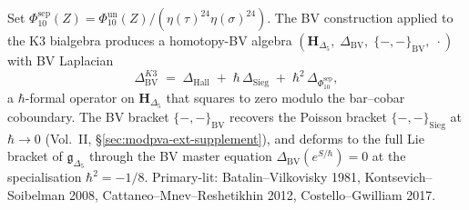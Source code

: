 \begin{remark}
\label{rem:bvconstr-ext-1}
Set \(\Phi_{10}^{\mathrm{sep}}(Z)=
\Phi_{10}^{\mathrm{un}}(Z)/(\eta(\tau)^{24}\eta(\sigma)^{24})\).
The BV construction applied to the K3 bialgebra produces a
homotopy-BV algebra
$(\mathbf H_{\Delta_5},\; \Delta_{\mathrm{BV}},\; \{-,-\}_{\mathrm{BV}},\; \cdot)$
with BV Laplacian
\[
\Delta_{\mathrm{BV}}^{K3} \;=\; \Delta_{\mathrm{Hall}} \;+\; \hbar\, \Delta_{\mathrm{Sieg}} \;+\; \hbar^2\, \Delta_{\Phi_{10}^{\mathrm{sep}}},
\]
a $\hbar$-formal operator on $\mathbf H_{\Delta_5}$ that squares to zero
modulo the bar--cobar coboundary. The BV bracket $\{-,-\}_{\mathrm{BV}}$
recovers the Poisson bracket $\{-,-\}_{\mathrm{Sieg}}$ at
$\hbar\to 0$ (Vol.~II, \S\ref{sec:modpva-ext-supplement}), and deforms
to the full Lie bracket of $\mathfrak g_{\Delta_5}$ through the
BV master equation $\Delta_{\mathrm{BV}}(e^{S/\hbar}) = 0$ at the
specialisation $\hbar^2 = -1/8$. Primary-lit: Batalin--Vilkovisky 1981,
Kontsevich--Soibelman 2008, Cattaneo--Mnev--Reshetikhin 2012,
Costello--Gwilliam 2017.
\end{remark}
